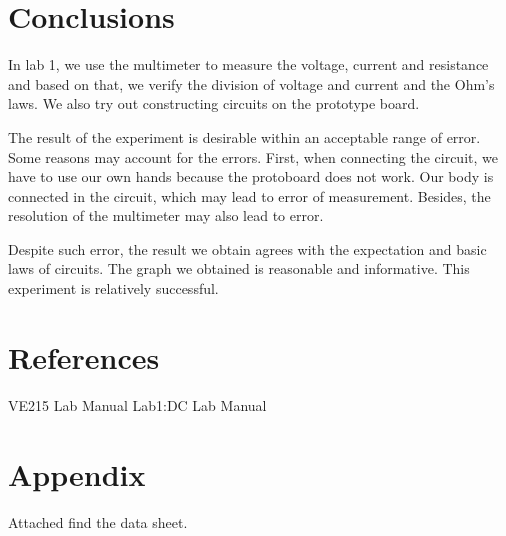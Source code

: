 \documentclass{article}
\begin{document}
		\section{Conclusions}
In lab 1, we use the multimeter to measure the voltage, current and resistance and based on that, we verify the division of voltage and current and the Ohm's laws. We also try out constructing circuits on the prototype board.

The result of the experiment is desirable within an acceptable range of error. Some reasons may account for the errors. First, when connecting the circuit, we have to use our own hands because the protoboard does not work. Our body is connected in the circuit, which may lead to error of measurement. Besides, the resolution of the multimeter may also lead to error.

Despite such error, the result we obtain agrees with the expectation and basic laws of circuits. The graph we obtained is reasonable and informative. This experiment is relatively successful.


\section{References}
\noindent [1] VE215 Lab Manual Lab1:DC Lab Manual

\section{Appendix}
Attached find the data sheet.
\end{document}
